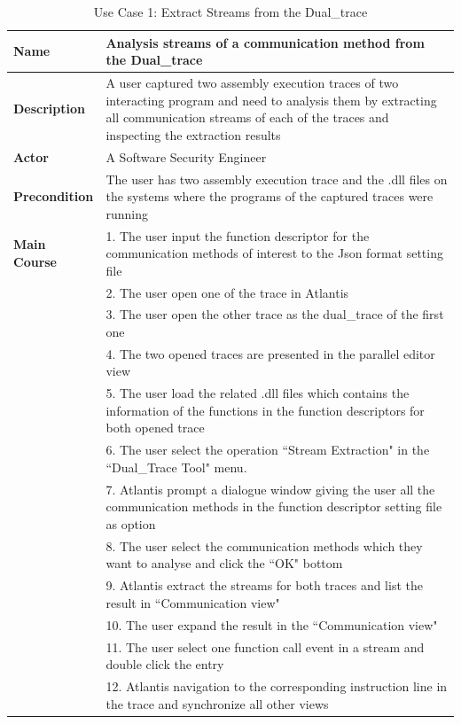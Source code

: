 \begin{table}[H]
  \centering
  \caption{Use Case 1: Extract Streams from the Dual\_trace}
  \label{usecase1}
  \begin{tabular}{|l|p{13cm}|}
      \hline
       \textbf{Name} & Analysis streams of a communication method from the Dual\_trace\\
       \hline
       \textbf{Description} & A user captured two assembly execution traces of two interacting program and need to analysis them by extracting all communication streams of each of the traces and inspecting the extraction results \\
       \hline
              \textbf{Actor} & A Software Security Engineer \\
       \hline
       \textbf{Precondition} & The user has two assembly execution trace and the .dll files on the systems where the programs of the captured traces were running\\
       \hline
       \textbf{Main Course}& 1. The user input the function descriptor for the communication methods of interest to the Json format setting file\\
        & 2. The user open one of the trace in Atlantis\\
       &  3. The user open the other trace as the dual\_trace of the first one\\
       & 4. The two opened traces are presented in the parallel editor view\\
       & 5. The user load the related .dll files which contains the information of the functions in the function descriptors for both opened trace\\
       & 6. The user select the operation ``Stream Extraction" in the ``Dual\_Trace Tool" menu.\\
       & 7. Atlantis prompt a dialogue window giving the user all the communication methods in the function descriptor setting file as option\\
       & 8. The user select the communication methods which they want to analyse and click the ``OK" bottom\\
       & 9. Atlantis extract the streams for both traces and list the result in ``Communication view"\\
       & 10. The user expand the result in the ``Communication view"\\
       & 11. The user select one function call event in a stream and double click the entry\\
       & 12. Atlantis navigation to the corresponding instruction line in the trace and synchronize all other views\\
      \hline               
  \end{tabular}
\end{table}

